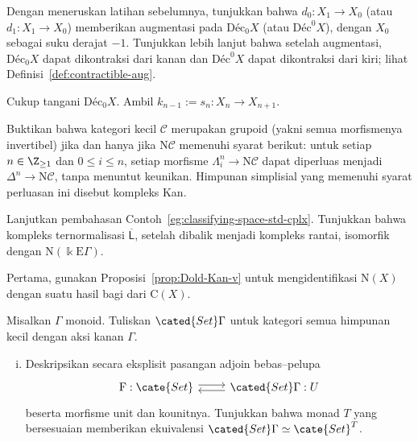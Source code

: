 \begin{Exercises}
	\item Dengan meneruskan latihan sebelumnya, tunjukkan bahwa
	$d_0:X_1\to X_0$ (atau $d_1:X_1\to X_0$) memberikan augmentasi pada
	$\mathrm{Déc}_0X$ (atau $\mathrm{Déc}^0X$), dengan $X_0$ sebagai suku
	derajat $-1$. Tunjukkan lebih lanjut bahwa setelah augmentasi,
	$\mathrm{Déc}_0X$ dapat dikontraksi dari kanan dan $\mathrm{Déc}^0X$
	dapat dikontraksi dari kiri; lihat Definisi~\ref{def:contractible-aug}.
	\begin{hint}
		Cukup tangani $\mathrm{Déc}_0X$. Ambil
		$k_{n-1}:=s_n:X_n\to X_{n+1}$.
	\end{hint}

	\item Buktikan bahwa kategori kecil $\mathcal{C}$ merupakan grupoid
	(yakni semua morfismenya invertibel) jika dan hanya jika
	$\mathrm{N}\mathcal{C}$ memenuhi syarat berikut: untuk setiap
	$n\in\Z_{\geq1}$ dan $0\leq i\leq n$, setiap morfisme
	$\Lambda^n_i\to\mathrm{N}\mathcal{C}$ dapat diperluas menjadi
	$\Delta^n\to\mathrm{N}\mathcal{C}$, tanpa menuntut keunikan. Himpunan
	simplisial yang memenuhi syarat perluasan ini disebut kompleks Kan.

	\item Lanjutkan pembahasan Contoh~\ref{eg:classifying-space-std-cplx}.
	Tunjukkan bahwa kompleks ternormalisasi $\overline{\mathsf{L}}$, setelah
	dibalik menjadi kompleks rantai, isomorfik dengan
	$\mathrm{N}(\Bbbk\mathrm{E}\Gamma)$.
	\begin{hint}
		Pertama, gunakan Proposisi~\ref{prop:Dold-Kan-v} untuk mengidentifikasi
		$\mathrm{N}(X)$ dengan suatu hasil bagi dari $\mathrm{C}(X)$.
	\end{hint}

	\item Misalkan $\Gamma$ monoid. Tuliskan $\cated{Set}\Gamma$ untuk kategori
	semua himpunan kecil dengan aksi kanan $\Gamma$.
	\begin{enumerate}[(i)]
		\item Deskripsikan secara eksplisit pasangan adjoin bebas--pelupa
		\[\begin{tikzcd}
			\mathrm{F}: \cate{Set} \arrow[shift left, r] & \cated{Set}\Gamma \arrow[shift left, l]: U
		\end{tikzcd}\]
		beserta morfisme unit dan kounitnya. Tunjukkan bahwa monad $T$ yang
		bersesuaian memberikan ekuivalensi
		$\cated{Set}\Gamma\simeq\cate{Set}^T$.


\end{enumerate}
\end{Exercises}
